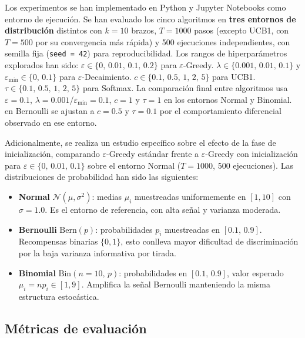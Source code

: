 Los experimentos se han implementado en Python y Jupyter Notebooks como entorno de ejecución. Se han evaluado los cinco algoritmos en \textbf{tres entornos de distribución} distintos con $k=10$ brazos, $T=1000$ pasos (excepto UCB1, con $T=500$ por su convergencia más rápida) y 500 ejecuciones independientes, con semilla fija (\texttt{seed = 42}) para reproducibilidad. Los rangos de hiperparámetros explorados han sido: $\varepsilon \in \{0,\, 0{.}01,\, 0{.}1,\, 0{.}2\}$ para $\varepsilon$-Greedy. $\lambda \in \{0{.}001,\, 0{.}01,\, 0{.}1\}$ y $\varepsilon_{\min} \in \{0,\, 0{.}1\}$ para $\varepsilon$-Decaimiento. $c \in \{0{.}1,\, 0{.}5,\, 1,\, 2,\, 5\}$ para UCB1. $\tau \in \{0{.}1,\, 0{.}5,\, 1,\, 2,\, 5\}$ para Softmax. La comparación final entre algoritmos usa $\varepsilon{=}0{.}1$, $\lambda{=}0{.}001$/$\varepsilon_{\min}{=}0{.}1$, $c{=}1$ y $\tau{=}1$ en los entornos Normal y Binomial. en Bernoulli se ajustan a $c{=}0{.}5$ y $\tau{=}0{.}1$ por el comportamiento diferencial observado en ese entorno.

Adicionalmente, se realiza un estudio específico sobre el efecto de la fase de inicialización, comparando $\varepsilon$-Greedy estándar frente a $\varepsilon$-Greedy con inicialización para $\varepsilon \in \{0,\, 0{.}01,\, 0{.}1\}$ sobre el entorno Normal ($T=1000$, 500 ejecuciones). Las distribuciones de probabilidad han sido las siguientes:

\begin{itemize}
    \item \textbf{Normal} $\mathcal{N}(\mu, \sigma^2)$: medias $\mu_i$ muestreadas uniformemente en $[1, 10]$ con $\sigma = 1{.}0$. Es el entorno de referencia, con alta señal y varianza moderada.

    \item \textbf{Bernoulli} $\text{Bern}(p)$: probabilidades $p_i$ muestreadas en $[0{.}1,\, 0{.}9]$. Recompensas binarias $\{0, 1\}$, esto conlleva mayor dificultad de discriminación por la baja varianza informativa por tirada.

    \item \textbf{Binomial} $\text{Bin}(n{=}10,\, p)$: probabilidades en $[0{.}1,\, 0{.}9]$, valor esperado $\mu_i = n p_i \in [1, 9]$. Amplifica la señal Bernoulli manteniendo la misma estructura estocástica.
\end{itemize}

\subsection*{Métricas de evaluación}

